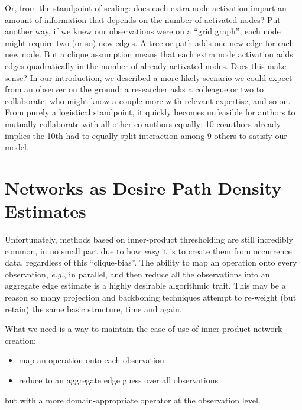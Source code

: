 \documentclass[%
	12pt,
		oneside,
		letterpaper
]{book}
\providecommand{\tightlist}{%
  \setlength{\itemsep}{0pt}\setlength{\parskip}{0pt}}\usepackage{longtable,booktabs,array}
\begin{document}
Or, from the standpoint of scaling: does each extra node activation
impart an amount of information that depends on the number of activated
nodes? Put another way, if we knew our observations were on a ``grid
graph'', each node might require two (or so) new edges. A tree or path
adds one new edge for each new node. But a clique assumption means that
each extra node activation adds edges quadratically in the number of
already-activated nodes. Does this make sense? In our introduction, we
described a more likely scenario we could expect from an observer on the
ground: a researcher asks a colleague or two to collaborate, who might
know a couple more with relevant expertise, and so on. From purely a
logistical standpoint, it quickly becomes unfeasible for authors to
mutually collaborate with all other co-authors equally: 10 coauthors
already implies the 10th had to equally split interaction among 9 others
to satisfy our model.

\section{Networks as Desire Path Density
Estimates}\label{networks-as-desire-path-density-estimates}

Unfortunately, methods based on inner-product thresholding are still
incredibly common, in no small part due to how \emph{easy} it is to
create them from occurrence data, regardless of this ``clique-bias''.
The ability to map an operation onto every observation, \emph{e.g.}, in
parallel, and then reduce all the observations into an aggregate edge
estimate is a highly desirable algorithmic trait. This may be a reason
so many projection and backboning techniques attempt to re-weight (but
retain) the same basic structure, time and again.

What we need is a way to maintain the ease-of-use of inner-product
network creation:

\begin{itemize}
\tightlist
\item
  map an operation onto each observation
\item
  reduce to an aggregate edge guess over all observations
\end{itemize}

but with a more domain-appropriate operator at the observation level.
\end{document}
